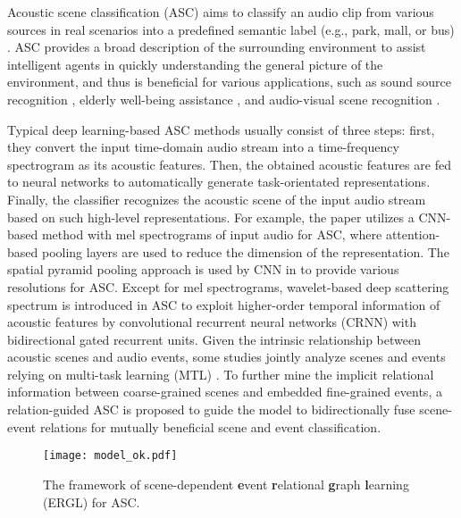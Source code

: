 \documentclass{article}
\begin{document}
\vspace{-0.2cm}
Acoustic scene classification (ASC) aims to classify an audio clip from various sources in real scenarios into a predefined semantic label (e.g., park, mall, or bus) \cite{acoustic_scene}. 
ASC provides a broad description of the surrounding environment to assist intelligent agents in quickly understanding the general picture of the environment, and thus is beneficial for various applications, such as sound source recognition \cite{sound_source}, elderly well-being assistance \cite{well-being}, and audio-visual scene recognition \cite{mmsp}.

  

Typical deep learning-based ASC methods usually consist of three steps: first, they convert the input time-domain audio stream into a time-frequency spectrogram as its acoustic features. 
Then, the obtained acoustic features are fed to neural networks to automatically generate task-orientated representations. Finally, the classifier recognizes the acoustic scene of the input audio stream based on such high-level representations. 
For example, the paper \cite{Ren2018} utilizes a CNN-based method with mel spectrograms of input audio for ASC, where attention-based pooling layers are used to reduce the dimension of the representation.
The spatial pyramid pooling approach is used by CNN in \cite{basbug2019acoustic} to provide various resolutions for ASC. 
Except for mel spectrograms, wavelet-based deep scattering spectrum \cite{li_icmew} is introduced in ASC to exploit higher-order temporal information of acoustic features by convolutional
recurrent neural networks (CRNN) with bidirectional gated recurrent units.
Given the intrinsic relationship between acoustic scenes and audio events, some studies jointly analyze scenes and events relying on multi-task learning (MTL) \cite{Bear2019TowardsJS, tonami2021joint, komatsu2020scene}.
To further mine the implicit relational information between coarse-grained scenes and embedded fine-grained events, a relation-guided ASC \cite{RGASC} is proposed to guide the model to bidirectionally fuse scene-event relations for mutually beneficial scene and event classification.


\label{ssec:figure-f}
\begin{figure*}[t] 
	\setlength{\abovecaptionskip}{0.03cm}  
	\setlength{\belowcaptionskip}{-0.6cm}   
	\centerline{\texttt{[image: model\_ok.pdf]}}
	\caption{The framework of scene-dependent \textbf{e}vent \textbf{r}elational \textbf{g}raph \textbf{l}earning (ERGL) for ASC.}
	\label{model}
\end{figure*} 
\end{document}
